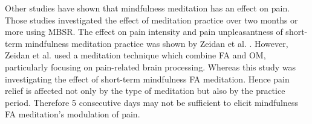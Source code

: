 Other studies have shown that mindfulness meditation has an effect on pain. Those studies investigated the effect of meditation practice over two months or more using MBSR. \cite{Kabat1982,Rosenzweig2010} The effect on pain intensity and pain unpleasantness of short-term mindfulness meditation practice was shown by Zeidan et al. \cite{Zeidan2012}. However, Zeidan et al. \cite{Zeidan2012} used a meditation technique which combine FA and OM, particularly focusing on pain-related brain processing. Whereas this study was investigating the effect of short-term mindfulness FA meditation. Hence pain relief is affected not only by the type of meditation but also by the practice period. Therefore 5 consecutive days may not be sufficient to elicit mindfulness FA meditation’s modulation of pain.



